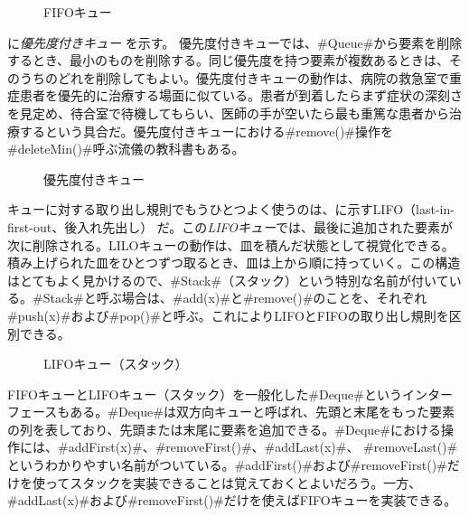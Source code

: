 \begin{figure}
  \caption{FIFOキュー}
\end{figure}

に\emph{優先度付きキュー}%
%
%
%
を示す。
優先度付きキューでは、#Queue#から要素を削除するとき、最小のものを削除する。同じ優先度を持つ要素が複数あるときは、そのうちのどれを削除してもよい。優先度付きキューの動作は、病院の救急室で重症患者を優先的に治療する場面に似ている。患者が到着したらまず症状の深刻さを見定め、待合室で待機してもらい、医師の手が空いたら最も重篤な患者から治療するという具合だ。優先度付きキューにおける#remove()#操作を#deleteMin()#呼ぶ流儀の教科書もある。 %

\begin{figure}
  \caption{優先度付きキュー}
\end{figure}

キューに対する取り出し規則でもうひとつよく使うのは、に示すLIFO（last-in-first-out、後入れ先出し）
%
%
%
%
だ。この\emph{LIFOキュー}では、最後に追加された要素が次に削除される。LILOキューの動作は、皿を積んだ状態として視覚化できる。積み上げられた皿をひとつずつ取るとき、皿は上から順に持っていく。この構造はとてもよく見かけるので、#Stack#（スタック）という特別な名前が付いている。#Stack#と呼ぶ場合は、#add(x)#と#remove()#のことを、それぞれ#push(x)#および#pop()#と呼ぶ。これによりLIFOとFIFOの取り出し規則を区別できる。

\begin{figure}
  \caption{LIFOキュー（スタック）}
\end{figure}

FIFOキューとLIFOキュー（スタック）を一般化した#Deque#というインターフェースもある。#Deque#は双方向キューと呼ばれ、先頭と末尾をもった要素の列を表しており、先頭または末尾に要素を追加できる。#Deque#における操作には、#addFirst(x)#、#removeFirst()#、#addLast(x)#、 #removeLast()#というわかりやすい名前がついている。#addFirst()#および#removeFirst()#だけを使ってスタックを実装できることは覚えておくとよいだろう。一方、#addLast(x)#および#removeFirst()#だけを使えばFIFOキューを実装できる。 %

